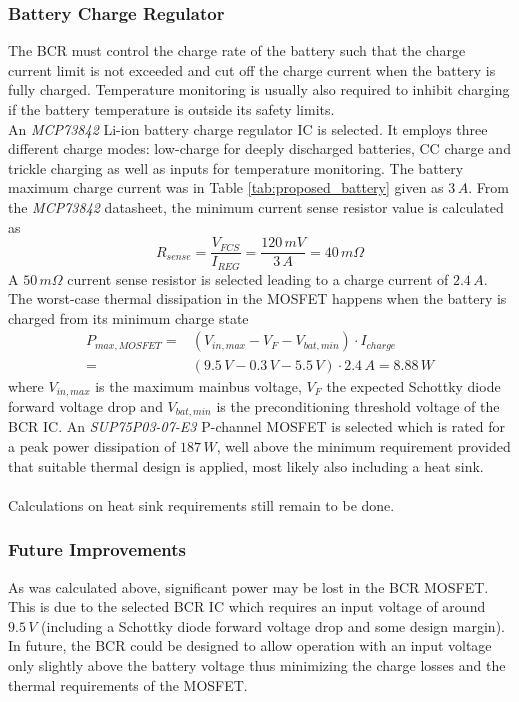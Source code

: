 \subsubsection{Battery Charge Regulator}
\label{subsec:BCR}
%
The \ac{BCR} must control the charge rate of the battery such that the charge current limit is not exceeded and cut off the charge current when the battery is fully charged. Temperature monitoring is usually also required to inhibit charging if the battery temperature is outside its safety limits. 
\\
%
\noindent
An \textit{MCP73842} Li-ion battery charge regulator \ac{IC} is selected. It employs three different charge modes: low-charge for deeply discharged batteries, \ac{CC} charge and trickle charging as well as inputs for temperature monitoring. The battery maximum charge current was in Table \ref{tab:proposed_battery} given as $3\,A$. From the \textit{MCP73842} datasheet, the minimum current sense resistor value is calculated as
%
\begin{equation}
R_{sense}=\dfrac{V_{FCS}}{I_{REG}}=\dfrac{120\,mV}{3\,A}=40\,m\Omega
\end{equation}
%
A $50\,m \Omega$ current sense resistor is selected leading to a charge current of $2.4\,A$.
%
The worst-case thermal dissipation in the MOSFET happens when the battery is charged from its minimum charge state
%
\begin{equation}
\begin{split}
P_{max,MOSFET}=&(V_{in,max}-V_F-V_{bat,min})\cdot I_{charge}\\
=&(9.5\,V-0.3\,V-5.5\,V)\cdot 2.4\,A=8.88\,W
\end{split}
\end{equation}
%
where $V_{in,max}$ is the maximum mainbus voltage, $V_F$ the expected Schottky diode forward voltage drop and $V_{bat,min}$ is the preconditioning threshold voltage of the \ac{BCR} \ac{IC}.
An \textit{SUP75P03-07-E3} P-channel MOSFET is selected which is rated for a peak power dissipation of $187\,W$, well above the minimum requirement provided that suitable thermal design is applied, most likely also including a heat sink. 
\\
\\
Calculations on heat sink requirements still remain to be done.
%
\subsubsection*{Future Improvements}
As was calculated above, significant power may be lost in the \ac{BCR} MOSFET. This is due to the selected \ac{BCR} \ac{IC} which requires an input voltage of around $9.5\,V$ (including a Schottky diode forward voltage drop and some design margin). In future, the \ac{BCR} could be designed to allow operation with an input voltage only slightly above the battery voltage thus minimizing the charge losses and the thermal requirements of the MOSFET.
%
%
